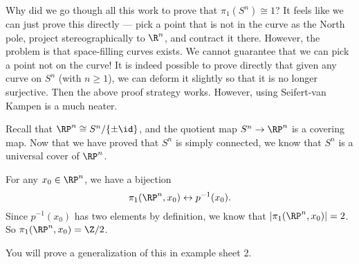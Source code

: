 \documentclass[a4paper]{article}
\begin{document}
Why did we go though all this work to prove that $\pi_1(S^n) \cong 1$? It feels like we can just prove this directly --- pick a point that is not in the curve as the North pole, project stereographically to $\R^n$, and contract it there. However, the problem is that space-filling curves exists. We cannot guarantee that we can pick a point not on the curve! It is indeed possible to prove directly that given any curve on $S^n$ (with $n \geq 1$), we can deform it slightly so that it is no longer surjective. Then the above proof strategy works. However, using Seifert-van Kampen is a much neater.

\begin{eg}[$\RP^n$]
  Recall that $\RP^n \cong S^n/\{\pm \id\}$, and the quotient map $S^n \to \RP^n$ is a covering map. Now that we have proved that $S^n$ is simply connected, we know that $S^n$ is a universal cover of $\RP^n$.

  For any $x_0 \in \RP^n$, we have a bijection
  \[
    \pi_1(\RP^n, x_0) \leftrightarrow p^{-1}(x_0).
  \]
  Since $p^{-1}(x_0)$ has two elements by definition, we know that $|\pi_1(\RP^n, x_0)| = 2$. So $\pi_1(\RP^n, x_0) = \Z/2$.
\end{eg}
You will prove a generalization of this in example sheet 2.
\end{document}
